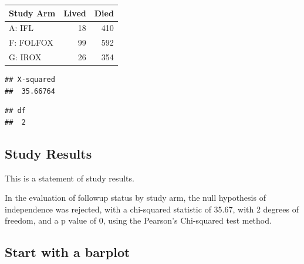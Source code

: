 \documentclass[
]{book}
\newenvironment{Shaded}{\begin{snugshade}}{\end{snugshade}}
\newcommand{\KeywordTok}[1]{\textcolor[rgb]{0.13,0.29,0.53}{\textbf{#1}}}
\newcommand{\NormalTok}[1]{#1}
\newcommand{\OperatorTok}[1]{\textcolor[rgb]{0.81,0.36,0.00}{\textbf{#1}}}
\newcommand{\StringTok}[1]{\textcolor[rgb]{0.31,0.60,0.02}{#1}}
\begin{document}
\captionsetup[table]{labelformat=empty,skip=1pt}
\begin{longtable}{lrr}
\toprule
Study Arm & Lived & Died \\ 
\midrule
A: IFL & 18 & 410 \\ 
F: FOLFOX & 99 & 592 \\ 
G: IROX & 26 & 354 \\ 
\bottomrule
\end{longtable}

\begin{Shaded}
\end{Shaded}

\begin{verbatim}
## X-squared 
##  35.66764
\end{verbatim}

\begin{Shaded}
\end{Shaded}

\begin{verbatim}
## df 
##  2
\end{verbatim}

\hypertarget{study-results-2}{%
\subsection{Study Results}\label{study-results-2}}

This is a statement of study results.

In the evaluation of followup status by study arm, the null hypothesis of independence was rejected, with a chi-squared statistic of 35.67, with 2 degrees of freedom, and a p value of 0, using the Pearson's Chi-squared test method.

\hypertarget{start-with-a-barplot-1}{%
\subsection{Start with a barplot}\label{start-with-a-barplot-1}}
\end{document}
